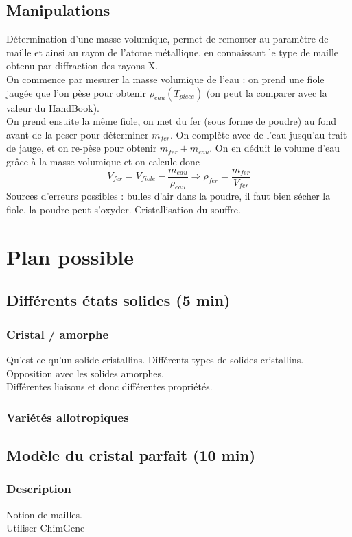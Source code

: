 \documentclass[12pt,prb,aps,epsf]{article}
\begin{document}
\subsection{Manipulations}
Détermination d'une masse volumique, permet de remonter au paramètre de maille et ainsi au rayon de l'atome métallique, en connaissant le type de maille obtenu par diffraction des rayons X.\\
On commence par mesurer la masse volumique de l'eau : on prend une fiole jaugée que l'on pèse pour obtenir $\rho_{eau}(T_{piece})$ (on peut la comparer avec la valeur du HandBook).\\
On prend ensuite la même fiole, on met du fer (sous forme de poudre) au fond avant de la peser pour déterminer $m_{fer}$. On complète avec de l'eau jusqu'au trait de jauge, et on re-pèse pour obtenir $m_{fer} + m_{eau}$. On en déduit le volume d'eau grâce à la masse volumique et on calcule donc 
\begin{equation}
V_{fer} = V_{fiole} - \frac{m_{eau}}{\rho_{eau}} \Longrightarrow \rho_{fer} = \frac{m_{fer}}{V_{fer}}
\end{equation} 
Sources d'erreurs possibles : bulles d'air dans la poudre, il faut bien sécher la fiole, la poudre peut s'oxyder.
Cristallisation du souffre.
	
\section{Plan possible}	
\subsection{Différents états solides (5 min)}
\subsubsection{Cristal / amorphe}
Qu'est ce qu'un solide cristallins. Différents types de solides cristallins. Opposition avec les solides amorphes.\\

Différentes liaisons et donc différentes propriétés.
\subsubsection{Variétés allotropiques}
\subsection{Modèle du cristal parfait (10 min)}
\subsubsection{Description}
Notion de mailles.\\
Utiliser ChimGene
\end{document}
